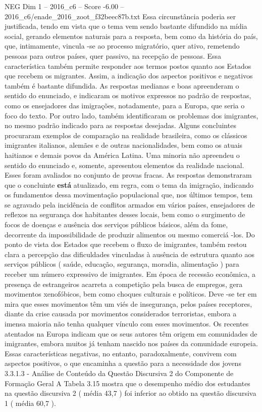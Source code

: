 \begin{textsample}{NEG Dim 1 – 2016\_c6 – Score -6.00 – 2016\_c6/enade\_2016\_zoot\_f32beec87b.txt}
Essa circunstância poderia ser justificada, tendo em vista que o tema vem sendo bastante difundido na mídia social, gerando elementos naturais para a resposta, bem como da história do país, que, intimamente, vincula -se ao processo migratório, quer ativo, remetendo pessoas para outros países, quer passivo, na recepção de pessoas.
Essa característica também permite responder aos termos postos quanto aos Estados que recebem os migrantes.
Assim, a indicação dos aspectos positivos e negativos também é bastante difundida.
As respostas medianas e boas apreenderam o sentido do enunciado, e indicaram os motivos expressos no padrão de respostas, como os ensejadores das imigrações, notadamente, para a Europa, que seria o foco do texto.
Por outro lado, também identificaram os problemas dos imigrantes, no mesmo padrão indicado para as respostas desejadas.
Alguns concluintes procuraram exemplos de comparação na realidade brasileira, como os clássicos imigrantes italianos, alemães e de outras nacionalidades, bem como os atuais haitianos e demais povos da América Latina.
Uma minoria não apreendeu o sentido do enunciado e, somente, apresentou elementos da realidade nacional.
Esses foram avaliados no conjunto de provas fracas.
As respostas demonstraram que o concluinte \textbf{está} atualizado, em regra, com o tema da imigração, indicando os fundamentos dessa movimentação populacional que, nos últimos tempos, tem se agravado pela incidência de conflitos armados em vários países, ensejadores de reflexos na segurança dos habitantes desses locais, bem como o surgimento de focos de doenças e ausência dos serviços públicos básicos, além da fome, decorrente da impossibilidade de produzir alimentos ou mesmo comerciá -los.
Do ponto de vista dos Estados que recebem o fluxo de imigrantes, também restou clara a percepção das dificuldades vinculadas à ausência de estrutura quanto aos serviços públicos ( saúde, educação, segurança, moradia, alimentação ) para receber um número expressivo de imigrantes.
Em época de recessão econômica, a presença de estrangeiros acarreta a competição pela busca de empregos, gera movimentos xenofóbicos, bem como choques culturais e políticos.
Deve -se ter em mira que esses movimentos têm um viés de insegurança, pelos países receptores, diante da crise causada por movimentos considerados terroristas, embora a imensa maioria não tenha qualquer vínculo com esses movimentos.
Os recentes atentados na Europa indicam que os seus autores têm origem em comunidades de imigrantes, embora muitos já tenham nascido nos países da comunidade europeia.
Essas características negativas, no entanto, paradoxalmente, convivem com aspectos positivos, o que encaminha a questão para a necessidade dos jovens 3.3.1.3 - Análise de Conteúdo da Questão Discursiva 2 do Componente de Formação Geral A Tabela 3.15 mostra que o desempenho médio dos estudantes na questão discursiva 2 ( média 43,7 ) foi inferior ao obtido na questão discursiva 1 ( média 60,7 ).

\end{textsample}
